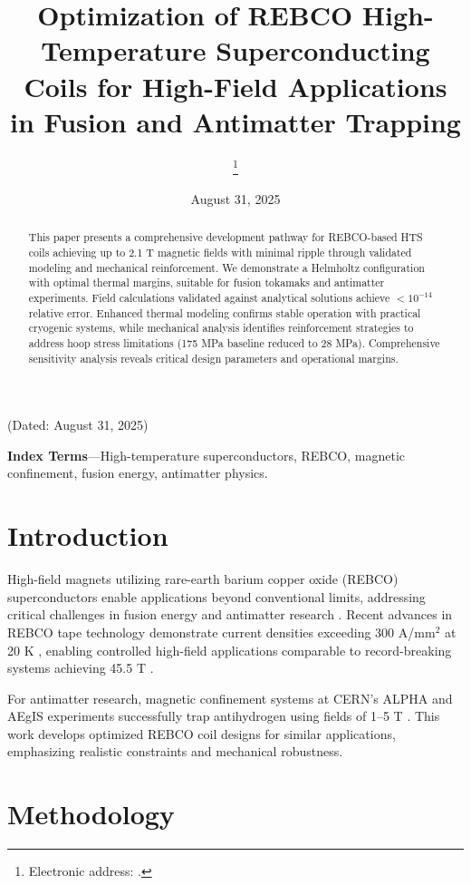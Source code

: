 \documentclass[10pt,twocolumn]{article}
\title{\Large\bfseries Optimization of REBCO High-Temperature Superconducting Coils for High-Field Applications in Fusion and Antimatter Trapping}
\author{\authorname\thanks{Electronic address: \texttt{\authoremail}.}}
\affil{Independent Researcher}
\date{August 31, 2025}
\begin{document}
\maketitle

\begin{center}
(Dated: August 31, 2025)
\end{center}

\begin{abstract}
This paper presents a comprehensive development pathway for REBCO-based HTS coils achieving up to 2.1 T magnetic fields with minimal ripple through validated modeling and mechanical reinforcement. We demonstrate a Helmholtz configuration with optimal thermal margins, suitable for fusion tokamaks and antimatter experiments. Field calculations validated against analytical solutions achieve $<10^{-14}$ relative error. Enhanced thermal modeling confirms stable operation with practical cryogenic systems, while mechanical analysis identifies reinforcement strategies to address hoop stress limitations (175 MPa baseline reduced to 28 MPa). Comprehensive sensitivity analysis reveals critical design parameters and operational margins.
\end{abstract}

\textbf{Index Terms}---High-temperature superconductors, REBCO, magnetic confinement, fusion energy, antimatter physics.

\section{Introduction}

High-field magnets utilizing rare-earth barium copper oxide (REBCO) superconductors enable applications beyond conventional limits, addressing critical challenges in fusion energy and antimatter research \cite{zhou2023}. Recent advances in REBCO tape technology demonstrate current densities exceeding 300 A/mm$^2$ at 20 K \cite{superpower2022}, enabling controlled high-field applications comparable to record-breaking systems achieving 45.5 T \cite{hahn2019}.

For antimatter research, magnetic confinement systems at CERN's ALPHA and AEgIS experiments successfully trap antihydrogen using fields of 1--5 T \cite{alpha2023,aegis2018}. This work develops optimized REBCO coil designs for similar applications, emphasizing realistic constraints and mechanical robustness.

\section{Methodology}
\end{document}
